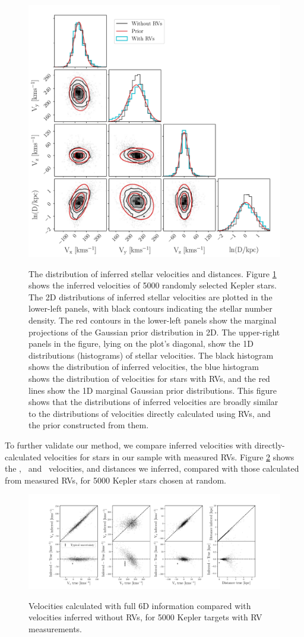 \begin{figure}[ht!]
\caption{
The distribution of inferred stellar velocities and distances.
    Figure \ref{fig:results} shows the inferred velocities of 5000 randomly
selected Kepler stars.
The 2D distributions of inferred stellar velocities are plotted in the
lower-left panels, with black contours indicating the stellar number density.
The red contours in the lower-left panels show the marginal projections of
    the Gaussian prior distribution in 2D.
The upper-right panels in the figure, lying on the plot's diagonal, show the
    1D distributions (histograms) of stellar velocities.
The black histogram shows the distribution of inferred velocities, the blue
histogram shows the distribution of velocities for stars with RVs,
and the red lines show the 1D marginal Gaussian prior distributions.
This figure shows that the distributions of inferred velocities are
    broadly similar to the distributions of velocities directly calculated
    using RVs, and the prior constructed from them.
}
  \centering
    \includegraphics[width=.7\textwidth]{results_figure}
\label{fig:results}
\end{figure}
To further validate our method, we compare inferred velocities with
directly-calculated velocities for stars in our sample with measured RVs.
Figure \ref{fig:residuals} shows the \vx, \vy\ and \vz\ velocities, and
distances we inferred, compared with those calculated from measured RVs, for
5000 Kepler stars chosen at random.
\begin{figure}[ht!]
\caption{Velocities calculated with full 6D information compared with
    velocities inferred without RVs, for 5000 Kepler targets with RV
    measurements.}
  \centering
    \includegraphics[width=1\textwidth]{residuals}
\label{fig:residuals}
\end{figure}
